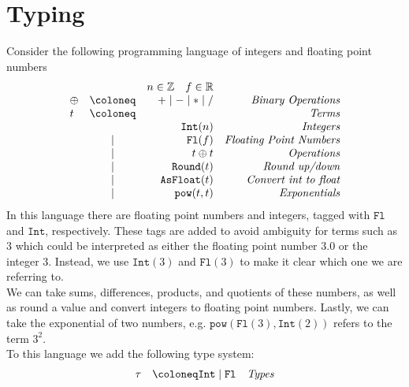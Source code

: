 \section{Typing}
Consider the following programming language of integers and floating point numbers 
\[
  \begin{array}{lcrr}
    & & n\in\mathbb{Z} \quad f\in\mathbb{R}\\
    \oplus & \coloneq & + \mid - \mid * \mid / &\emph{Binary Operations}\\
    t & \coloneq & & \emph{Terms} \\
    & & \mathtt{Int}(n) & \emph{Integers}\\ 
    & \mid & \mathtt{Fl}(f) & \emph{Floating Point Numbers} \\
    & \mid & t \oplus t & \emph{Operations}\\
    & \mid & \mathtt{Round}(t) & \emph{Round up/down}\\
    & \mid & \mathtt{AsFloat}(t) & \emph{Convert int to float}\\
    & \mid & \mathtt{pow}(t,t) & \emph{Exponentials}
  \end{array}
\]
In this language there are floating point numbers and integers, tagged with $\mathtt{Fl}$ and $\mathtt{Int}$, respectively.
These tags are added to avoid ambiguity for terms such as $3$ which could be interpreted as either the floating point number $3.0$ or the integer $3$. 
Instead, we use $\mathtt{Int}(3)$ and $\mathtt{Fl}(3)$ to make it clear which one we are referring to.\\
We can take sums, differences, products, and quotients of these numbers, as well as round a value and convert integers to floating point numbers.
Lastly, we can take the exponential of two numbers, e.g. $\mathtt{pow}(\mathtt{Fl}(3),\mathtt{Int}(2))$ refers to the term $3^2$.\\
To this language we add the following type system:
\[
  \begin{array}{lcrr}
    \tau & \coloneq \mathtt{Int} \mid \mathtt{Fl} & \emph{Types}
  \end{array}
\]

